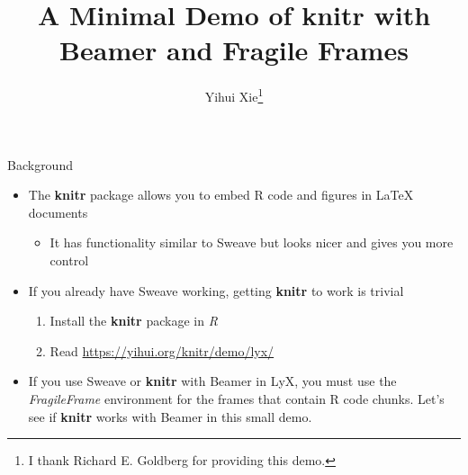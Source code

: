\documentclass[10pt]{beamer}\usepackage[]{graphicx}\usepackage[]{color}
\newcommand\makebeamertitle{\frame{\maketitle}}%
\begin{document}
\title[knitr, Beamer, and FragileFrame]{A Minimal Demo of knitr with Beamer and Fragile Frames}

\author{Yihui Xie\thanks{I thank Richard E. Goldberg for providing this demo.}}
\makebeamertitle
\begin{frame}{Background}

\begin{itemize}
\item The \textbf{knitr}\textbf{\emph{ }}package allows you to embed R code
and figures in \LaTeX{} documents

\begin{itemize}
\item It has functionality similar to Sweave but looks nicer and gives you
more control
\end{itemize}
\item If you already have Sweave working, getting \textbf{knitr}
to work is trivial

\begin{enumerate}
\item Install the \textbf{knitr} package in \emph{R}
\item Read \url{https://yihui.org/knitr/demo/lyx/}
\end{enumerate}
\item If you use Sweave or \textbf{knitr} with Beamer in LyX, you must
use the\emph{ FragileFrame} environment for the frames that contain
R code chunks. Let's see if \textbf{knitr} works with Beamer in this
small demo. 
\end{itemize}
\end{frame}
\end{document}
